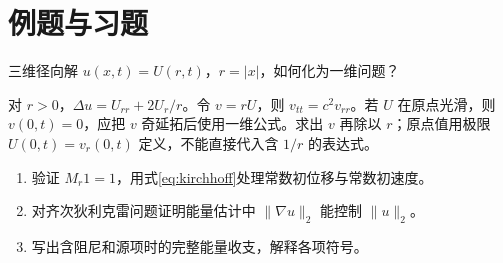\section{例题与习题}
\begin{example}
三维径向解 $u(x,t)=U(r,t)$，$r=|x|$，如何化为一维问题？
\end{example}
\begin{solve}
对 $r>0$，$\Delta u=U_{rr}+2U_r/r$。令 $v=rU$，则 $v_{tt}=c^2v_{rr}$。若 $U$ 在原点光滑，则 $v(0,t)=0$，应把 $v$ 奇延拓后使用一维公式。求出 $v$ 再除以 $r$；原点值用极限 $U(0,t)=v_r(0,t)$ 定义，不能直接代入含 $1/r$ 的表达式。
\end{solve}
\begin{enumerate}
 \item 验证 $M_r1=1$，用式\eqref{eq:kirchhoff}处理常数初位移与常数初速度。
 \item 对齐次狄利克雷问题证明能量估计中 $\|\nabla u\|_2$ 能控制 $\|u\|_2$。
 \item 写出含阻尼和源项时的完整能量收支，解释各项符号。
\end{enumerate}

